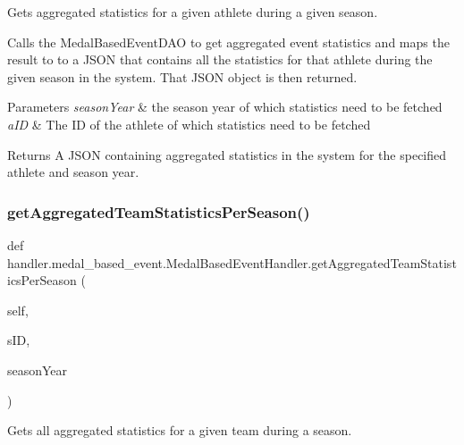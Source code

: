 Gets aggregated statistics for a given athlete during a given season. 

Calls the Medal\+Based\+Event\+D\+AO to get aggregated event statistics and maps the result to to a J\+S\+ON that contains all the statistics for that athlete during the given season in the system. That J\+S\+ON object is then returned.


\begin{DoxyParams}{Parameters}
{\em season\+Year} & the season year of which statistics need to be fetched \\
\hline
{\em a\+ID} & The ID of the athlete of which statistics need to be fetched\\
\hline
\end{DoxyParams}
\begin{DoxyReturn}{Returns}
A J\+S\+ON containing aggregated statistics in the system for the specified athlete and season year. 
\end{DoxyReturn}
\mbox{\label{classhandler_1_1medal__based__event_1_1_medal_based_event_handler_a6471325297119ddb6400226fe9841caa}} 
\subsubsection{\texorpdfstring{get\+Aggregated\+Team\+Statistics\+Per\+Season()}{getAggregatedTeamStatisticsPerSeason()}}
{\footnotesize\ttfamily def handler.\+medal\+\_\+based\+\_\+event.\+Medal\+Based\+Event\+Handler.\+get\+Aggregated\+Team\+Statistics\+Per\+Season (\begin{DoxyParamCaption}\item[{}]{self,  }\item[{}]{s\+ID,  }\item[{}]{season\+Year }\end{DoxyParamCaption})}



Gets all aggregated statistics for a given team during a season. 

